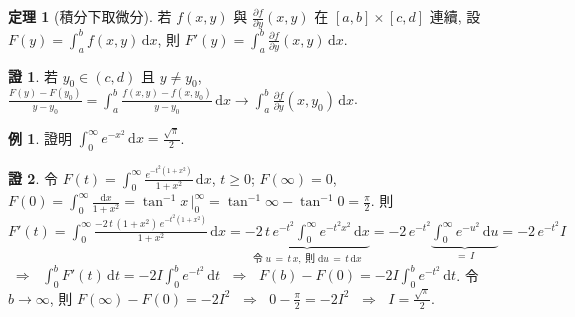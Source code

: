 \documentclass[12pt]{extarticle}
\newcommand{\ds}{\displaystyle}
\newcommand{\ie}{\;\Longrightarrow\;}
\theoremstyle{definition}
\newtheorem*{thm}{定理}
\newtheorem*{ex}{例}
\newtheorem*{prf}{證}
\begin{document}
\begin{thm}[積分下取微分]
  若 $f(x, y)$ 與 $\ds\frac{\partial f}{\partial y}(x, y)$ 在 $[a, b]\times[c, d]$ 連續, 設 $\ds F(y) = \int_{a}^{b}f(x, y)\,\mathrm{d}x$, 則 $\ds F'(y) = \int_{a}^{b}\frac{\partial f}{\partial y}(x, y)\,\mathrm{d}x$.
\end{thm}

\begin{prf}
  若 $y_0\in(c, d)$ 且 $y\ne y_0$, $\ds\frac{F(y) - F(y_0)}{y - y_0} = \int_a^b\frac{f(x, y) - f(x, y_0)}{y - y_0}\,\mathrm{d}x\to\int_a^b\frac{\partial f}{\partial y}(x, y_0)\,\mathrm{d}x$.
\end{prf}

%

\begin{ex}
  證明 $\ds\int_0^\infty e^{-x^2}\,\mathrm{d}x = \frac{\sqrt{\pi}}{2}$.
\end{ex}

\begin{prf}
  令 $\ds F(t) = \int_0^\infty\!\frac{e^{-t^2(1 + x^2)}}{1 + x^2}\,\mathrm{d}x$, $t\geqslant 0$; $F(\infty) = 0$, $\ds F(0) = \int_0^\infty\!\!\frac{\mathrm{d}x}{1 + x^2} = \tan^{-1}x\,\Big|_0^\infty = \tan^{-1}\infty - \tan^{-1}0 = \frac{\pi}{2}$. 則 $\ds F'(t) = \int_0^\infty\!\frac{-2\,t\,(1 + x^2)\,e^{-t^2(1 + x^2)}}{1 + x^2}\,\mathrm{d}x = \underbrace{-2\,t\,e^{-t^2}\!\!\int_0^\infty\!e^{-t^2x^2}\,\mathrm{d}x}_{\text{令}\;u\,=\,t\,x,\;\text{則}\;\mathrm{d}u\,=\,t\,\mathrm{d}x} = -2\,e^{-t^2}\!\!\underbrace{\int_0^\infty\!e^{-u^2}\,\mathrm{d}u}_{=\,I} = -2\,e^{-t^2} I$ $\ie$ $\ds\int_0^b F'(t)\,\mathrm{d}t = -2 I\int_0^b\!e^{-t^2}\,\mathrm{d}t$ $\ie$ $\ds F(b) - F(0) = -2 I\int_0^b\!e^{-t^2}\,\mathrm{d}t$. 令 $b\to\infty$, 則 $\ds F(\infty) - F(0) = -2 I^2$ $\ie$ $\ds 0 - \frac{\pi}{2} = -2 I^2$ $\ie$ $\ds I = \frac{\sqrt{\pi}}{2}$.
\end{prf}
\end{document}
